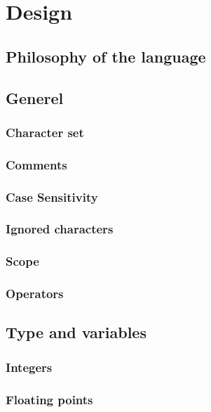 \chapter{Design}
\label{cha:Design}
\section{Philosophy of the language}


\section{Generel}
\subsection{Character set}

\subsection{Comments}

\subsection{Case Sensitivity}

\subsection{Ignored characters}

\subsection{Scope}

\subsection{Operators}

\section{Type and variables}
\subsection{Integers}

\subsection{Floating points}

